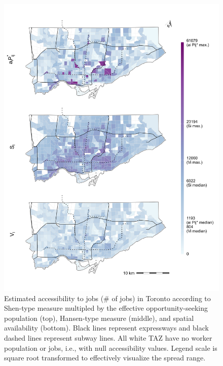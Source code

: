 \documentclass[10pt,letterpaper]{article}
\begin{document}
\begin{figure}
\includegraphics[width=1\linewidth]{images/Fig7} \caption{\label{fig:Fig7}Estimated accessibility to jobs (\# of jobs) in Toronto according to Shen-type measure multipled by the effective opportunity-seeking population (top), Hansen-type measure (middle), and spatial availability (bottom). Black lines represent expressways and black dashed lines represent subway lines. All white TAZ have no worker population or jobs, i.e., with null accessibility values. Legend scale is square root transformed to effectively visualize the spread range.}\label{fig:absolute-accessibility-plot}
\end{figure}
\end{document}

